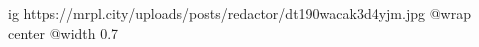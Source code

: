  
 
 
 
 

\ifcmt
  ig https://mrpl.city/uploads/posts/redactor/dt190wacak3d4yjm.jpg
  @wrap center
  @width 0.7
\fi
